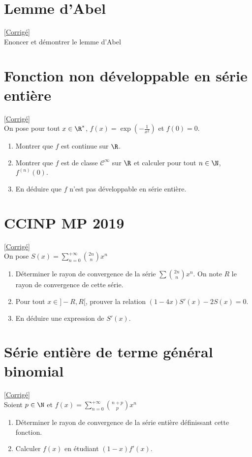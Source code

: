 \documentclass{book}
\begin{document}
\section{Lemme d'Abel}
\label{Lemme d'Abel}
\textcolor{blue}{\hyperref[sec:lemme-dabel]{[Corrigé]}}\\
Enoncer et démontrer le lemme d'Abel

\section{Fonction non développable en série entière}
\label{Fonction non développable en série entière}
\textcolor{blue}{\hyperref[sec:fonction-non-developpable-en-serie-entiere]{[Corrigé]}}\\
On pose pour tout $x\in\R^*$, $f(x)=\exp\left(-\displaystyle\frac{1}{x^2}\right)$ et $f(0)=0$.
\begin{enumerate}
	\item Montrer que $f$ est continue sur $\R$.
	\item Montrer que $f$ est de classe $\mathcal{C}^\infty$ sur $\R$ et calculer pour tout $n\in\N$, $f^{(n)}(0)$.
	\item En déduire que $f$ n'est pas développable en série entière.
\end{enumerate}

\section{CCINP MP 2019}
\label{CCINP MP 2019}
\textcolor{blue}{\hyperref[sec:ccinp-mp-2019]{[Corrigé]}}\\
On pose $S(x)=\displaystyle\sum_{n=0}^{+\infty}\binom{2n}{n}x^n$
\begin{enumerate}
	\item Déterminer le rayon de convergence de la série $\displaystyle\sum\binom{2n}{n}x^n$. On note $R$ le rayon de convergence de cette série.
	\item Pour tout $x\in]-R,R[$, prouver la relation $(1-4x)S'(x)-2S(x)=0$.
	\item En déduire une expression de $S'(x)$.
\end{enumerate}

\section{Série entière de terme général binomial}
\label{Série entière de terme général binomial}
\textcolor{blue}{\hyperref[sec:serie-entiere-de-terme-general-binomial]{[Corrigé]}}\\
Soient $p\in\N$ et $\displaystyle f(x)=\sum_{n=0}^{+\infty}\binom{n+p}{p}x^n$
\begin{enumerate}
	\item Déterminer le rayon de convergence de la série entière définissant cette fonction.
	\item Calculer $f(x)$ en étudiant $(1-x)f'(x)$.
\end{enumerate}
\end{document}
